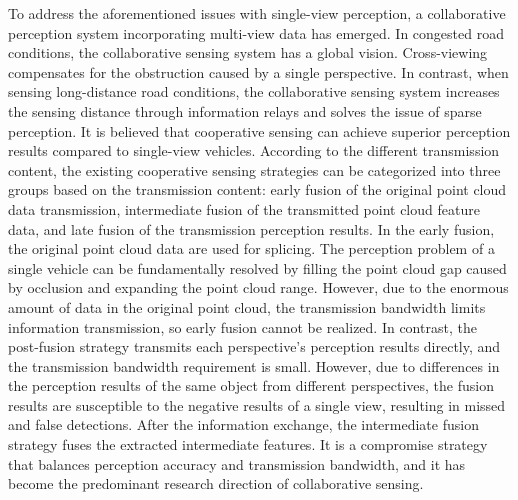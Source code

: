 \documentclass[lettersize,journal]{IEEEtran}
\begin{document}
To address the aforementioned issues with single-view perception, a collaborative perception system incorporating multi-view data has emerged. In congested road conditions, the collaborative sensing system has a global vision. Cross-viewing compensates for the obstruction caused by a single perspective. In contrast, when sensing long-distance road conditions, the collaborative sensing system increases the sensing distance through information relays and solves the issue of sparse perception. It is believed that cooperative sensing can achieve superior perception results compared to single-view vehicles. According to the different transmission content, the existing cooperative sensing strategies can be categorized into three groups based on the transmission content: early fusion\cite{25} of the original point cloud data transmission, intermediate fusion \cite{8}\cite{26}\cite{27}\cite{28} of the transmitted point cloud feature data, and late fusion \cite{29}\cite{30}\cite{39} of the transmission perception results. In the early fusion, the original point cloud data are used for splicing. The perception problem of a single vehicle can be fundamentally resolved by filling the point cloud gap caused by occlusion and expanding the point cloud range. However, due to the enormous amount of data in the original point cloud, the transmission bandwidth limits information transmission, so early fusion cannot be realized. In contrast, the post-fusion strategy transmits each perspective's perception results directly, and the transmission bandwidth requirement is small. However, due to differences in the perception results of the same object from different perspectives, the fusion results are susceptible to the negative results of a single view, resulting in missed and false detections. After the information exchange, the intermediate fusion strategy fuses the extracted intermediate features. It is a compromise strategy that balances perception accuracy and transmission bandwidth, and it has become the predominant research direction of collaborative sensing.
\end{document}
